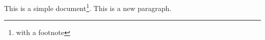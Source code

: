 \documentclass[a4paper,12pt]{article}
\begin{document}
 	This is a simple document\footnote{with a footnote}.
 	This is a new paragraph.
 
\end{document}
